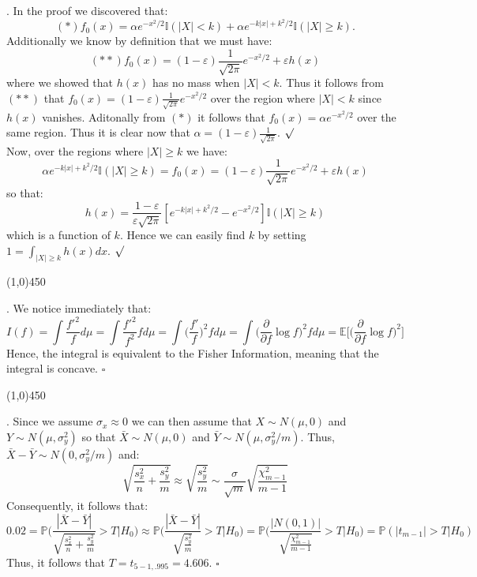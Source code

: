 \documentclass[12pt]{article}
\begin{document}

\def\ci{\perp\!\!\!\perp}
\def\ex{\mathbb{E}}
\def\prob{\mathbb{P}}
\def\ind{\mathbb{I}}
\def\grad{\triangledown}
\def\bigo{\mathcal{O}}

. In the proof we discovered that:
$$(*) f_0(x) = \alpha e^{-x^2/2}\ind(|X|<k)+\alpha e^{-k|x|+k^2/2}\ind(|X|\geq k).$$ 
Additionally we know by definition that we must have: 
$$(**) f_0(x) = (1-\varepsilon)\frac{1}{\sqrt{2\pi}}e^{-x^2/2}+\varepsilon h(x)$$ 
where we showed that $h(x)$ has no mass when $|X|<k$. Thus it follows from $(**)$ that $f_0(x) = (1-\varepsilon)\frac{1}{\sqrt{2\pi}}e^{-x^2/2}$ over the region where $|X|<k$ since $h(x)$ vanishes. Aditonally from $(*)$ it follows that $f_0(x) = \alpha e^{-x^2/2}$ over the same region. Thus it is clear now that $\alpha =  (1-\varepsilon)\frac{1}{\sqrt{2\pi}}$. $\surd$\\

\noindent
Now, over the regions where $|X|\geq k$ we have:
$$\alpha e^{-k|x|+k^2/2}\ind(|X|\geq k) = f_0(x) = (1-\varepsilon)\frac{1}{\sqrt{2\pi}}e^{-x^2/2}+\varepsilon h(x)$$
so that:
$$h(x) = \frac{1-\varepsilon}{\varepsilon\sqrt{2\pi}} [e^{-k|x|+k^2/2} - e^{-x^2/2}]\ind(|X|\geq k)$$
which is a function of $k$. Hence we can easily find $k$ by setting $1 = \int_{|X|\geq k} h(x) dx$. $\surd$
 \begin{center}
\line(1,0){450}
\end{center}

. We notice immediately that:
$$I(f) = \int \frac{f'^2}{f} d\mu
= \int \frac{f'^2}{f^2} f d\mu
= \int \biggl( \frac{f'}{f} \biggr)^2 f d\mu
= \int \biggl( \frac{\partial}{\partial f} \log f \biggr)^2 f d\mu
= \ex \biggl[ \biggl( \frac{\partial}{\partial f} \log f \biggr)^2 \biggr]$$
Hence, the integral is equivalent to the Fisher Information, meaning that the integral is concave. $\square$

 \begin{center}
\line(1,0){450}
\end{center}


. Since we assume $\sigma_x \approx 0$ we can then assume that $X \sim N(\mu,0)$ and $Y \sim N(\mu, \sigma_y^2)$ so that $\bar{X} \sim N(\mu,0)$ and $\bar{Y}\sim  N(\mu,\sigma_y^2/m)$. Thus, $\bar{X}-\bar{Y} \sim N(0, \sigma_y^2/m)$ and:
$$\sqrt{\frac{s_x^2}{n}+\frac{s_y^2}{m}} \approx \sqrt{\frac{s_y^2}{m}}
\sim \frac{\sigma}{\sqrt{m}}\sqrt{ \frac{\chi^2_{m-1}}{m-1}}$$
Consequently, it follows that:
$$0.02 = \prob \biggl( \frac{|\bar{X}-\bar{Y}|}{ \sqrt{\frac{s_x^2}{n}+\frac{s_y^2}{m}}}>T \biggr| H_0 \biggr)
\approx \prob \biggl( \frac{|\bar{X}-\bar{Y}|}{ \sqrt{\frac{s_y^2}{m}}}>T \biggr| H_0 \biggr)
= \prob \biggl( \frac{|N(0,1)|}{ \sqrt{\frac{\chi_{m-1}^2}{m-1}}}>T \biggr| H_0 \biggr)
= \prob (|t_{m-1}| > T | H_0)$$
Thus, it follows that $T = t_{5-1,.995} = 4.606$. $\square$\\
\end{document}
